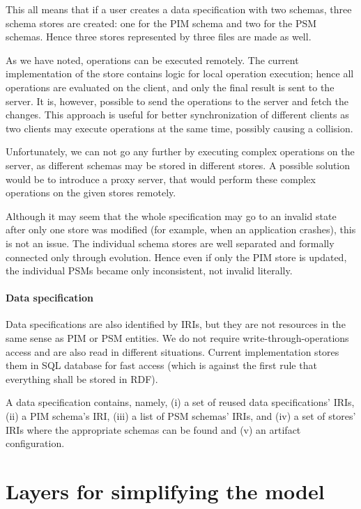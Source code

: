 This all means that if a user creates a data specification with two schemas, three schema stores are created: one for the PIM schema and two for the PSM schemas. Hence three stores represented by three files are made as well.

\medskip

As we have noted, operations can be executed remotely. The current implementation of the store contains logic for local operation execution; hence all operations are evaluated on the client, and only the final result is sent to the server. It is, however, possible to send the operations to the server and fetch the changes. This approach is useful for better synchronization of different clients as two clients may execute operations at the same time, possibly causing a collision.

Unfortunately, we can not go any further by executing complex operations on the server, as different schemas may be stored in different stores. A possible solution would be to introduce a proxy server, that would perform these complex operations on the given stores remotely.

Although it may seem that the whole specification may go to an invalid state after only one store was modified (for example, when an application crashes), this is not an issue. The individual schema stores are well separated and formally connected only through evolution. Hence even if only the PIM store is updated, the individual PSMs became only inconsistent, not invalid literally.

\paragraph{Data specification}

Data specifications are also identified by IRIs, but they are not resources in the same sense as PIM or PSM entities. We do not require write-through-operations access and are also read in different situations. Current implementation stores them in SQL database for fast access (which is against the first rule that everything shall be stored in RDF).

A data specification contains, namely, (i) a set of reused data specifications' IRIs, (ii) a PIM schema's IRI, (iii) a list of PSM schemas' IRIs, and (iv) a set of stores' IRIs where the appropriate schemas can be found and (v) an artifact configuration.

\section{Layers for simplifying the model}

